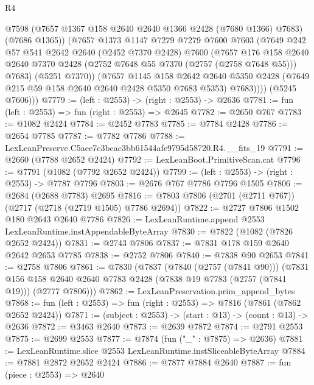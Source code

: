 \begin{lexlean}{R4}
\begin{coremodule}
              @7598
              (@7657 @1367 @158 @2640 @2640 @1366 @2428 (@7680 @1366) @7683)
              (@7686 @1365))
            (@7657
              @1373
              @1147
              @7279
              @7279
              @7600
              @7603
              (@7649
                @242
                @57
                @541
                @2642
                @2640
                (@2452 @7370 @2428)
                @7600
                (@7657
                  @176
                  @158
                  @2640
                  @2640
                  @7370
                  @2428
                  (@2752 @7648 @55 @7370 (@2757 (@2758 @7648 @55)))
                  @7683)
                (@5251 @7370))
              (@7657
                @1145
                @158
                @2642
                @2640
                @5350
                @2428
                (@7649 @215 @59 @158 @2640 @2640 @2428 @5350 @7683 @5353)
                @7683))))
        (@5245 @7606)))
@7779 := (left : @2553) -> (right : @2553) -> @2636
@7781 := fun (left : @2553) => fun (right : @2553) => @2645
@7782 := @2650 @767
@7783 := @1082 @2424
@7784 := @2452 @7783
@7785 := @7784 @2428
@7786 := @2654 @7785
@7787 := @7782 @7786
@7788 := LexLeanPreserve.C5aee7c3beac3bb61544afe9795d58720.R4.__fits_19
@7791 := @2660 (@7788 @2652 @2424)
@7792 := LexLeanBoot.PrimitiveScan.cat
@7796 := @7791 (@1082 (@7792 @2652 @2424))
@7799 := (left : @2553) -> (right : @2553) -> @7787 @7796
@7803 := @2676 @767 @7786 @7796 @1505
@7806 := @2684 (@2688 @7783) @2695
@7816 := @7803 @7806 (@2701 (@2711 @767)) (@2717 (@2718 (@2719 @1505) @7786 @2694))
@7822 := @2727 @7806 @1502 @180 @2643 @2640 @7786
@7826 := LexLeanRuntime.append @2553 LexLeanRuntime.instAppendableByteArray
@7830 := @7822 (@1082 (@7826 @2652 @2424))
@7831 := @2743 @7806
@7837 := @7831 @178 @159 @2640 @2642 @2653 @7785
@7838 := @2752 @7806
@7840 := @7838 @90 @2653
@7841 := @2758 @7806
@7861 := @7830
    (@7837
      (@7840 (@2757 (@7841 @90)))
      (@7831 @156 @158 @2640 @2640 @7783 @2428 (@7838 @19 @7783 (@2757 (@7841 @19))) (@2777 @7806)))
@7862 := LexLeanPreservation.prim_append_bytes
@7868 := fun (left : @2553) => fun (right : @2553) => @7816 (@7861 (@7862 @2652 @2424))
@7871 := (subject : @2553) -> (start : @13) -> (count : @13) -> @2636
@7872 := @3463 @2640
@7873 := @2639 @7872
@7874 := @2791 @2553
@7875 := @2699 @2553
@7877 := @7874 (fun ("_" : @7875) => @2636)
@7881 := LexLeanRuntime.slice @2553 LexLeanRuntime.instSliceableByteArray
@7884 := @7881 @2872 @2652 @2424
@7886 := @7877 @7884 @2640
@7887 := fun (piece : @2553) => @2640

\end{coremodule}
\end{lexlean}
